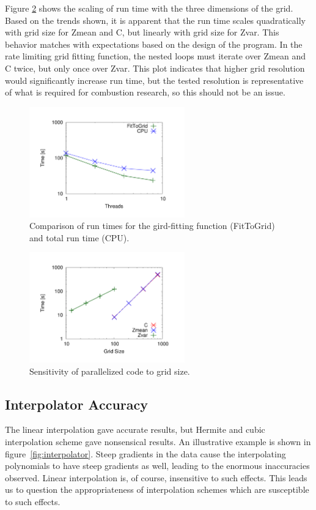 \documentclass[11pt]{article}
\begin{document}
Figure \ref{fig:gridsensitivity} shows the scaling of run time with
the three dimensions of the grid. Based on the trends shown, it is
apparent that the run time scales quadratically with grid size for
Zmean and C, but linearly with grid size for Zvar. This behavior
matches with expectations based on the design of the program. In the
rate limiting grid fitting function, the nested loops must iterate
over Zmean and C twice, but only once over Zvar. This plot indicates
that higher grid resolution would significantly increase run time, but
the tested resolution is representative of what is required for
combustion research, so this should not be an issue.

\begin{figure}[h]
\centering
\includegraphics[width=0.6\textwidth]{plot_threads}
\caption{\label{fig:fittogrid} Comparison of run times for the
  gird-fitting function (FitToGrid) and total run time (CPU).}
\end{figure}

\begin{figure}[h]
\centering
\includegraphics[width=0.6\textwidth]{plot_gridsizes}
\caption{\label{fig:gridsensitivity} Sensitivity of parallelized code
  to grid size.}
\end{figure}

\subsection{Interpolator Accuracy}
The linear interpolation gave accurate results, but Hermite and cubic
interpolation scheme gave nonsensical results. An illustrative example
is shown in figure~\ref{fig:interpolator}. Steep gradients in the data
cause the interpolating polynomials to have steep gradients as well,
leading to the enormous inaccuracies observed. Linear interpolation
is, of course, insensitive to such effects. This leads us to question
the appropriateness of interpolation schemes which are susceptible to
such effects.
\end{document}
